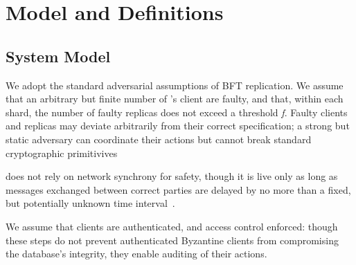 \section{Model and Definitions}


\subsection{System Model}

We adopt the standard adversarial assumptions of BFT replication. We assume that an arbitrary but finite number of \sys's client are faulty, and that, within each shard, the number of faulty replicas does not exceed a threshold \textit{f}. Faulty clients and replicas may deviate arbitrarily from their correct specification; a strong but static adversary can coordinate their actions but cannot break standard cryptographic primitivives

\sys{} does not rely on network synchrony for safety, though it is live only as long as messages exchanged between correct parties are delayed by no more than a fixed, but potentially unknown time interval~\cite{castro1999practical, fischer1985impossibility, kotla2007zyzzyva, clement2009making, buchman2016tendermint}.

We assume that clients are authenticated, and access control enforced: though these steps do not prevent  authenticated Byzantine clients from compromising the database's integrity, they enable auditing of their actions. 



